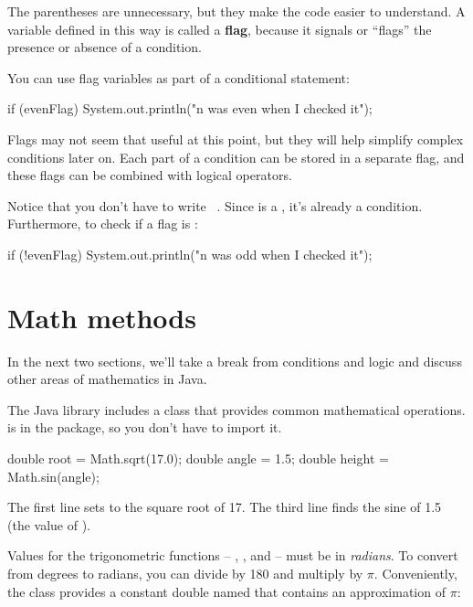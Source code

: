 The parentheses are unnecessary, but they make the code easier to understand.
A variable defined in this way is called a {\bf flag}, because it signals or ``flags'' the presence or absence of a condition.

You can use flag variables as part of a conditional statement:

\begin{code}
if (evenFlag) {
    System.out.println("n was even when I checked it");
}
\end{code}

Flags may not seem that useful at this point, but they will help simplify complex conditions later on.
Each part of a condition can be stored in a separate flag, and these flags can be combined with logical operators.

Notice that you don't have to write ~.
Since  is a , it's already a condition.
Furthermore, to check if a flag is :

\begin{code}
if (!evenFlag) {
    System.out.println("n was odd when I checked it");
}
\end{code}


\section{Math methods}

In the next two sections, we'll take a break from conditions and logic and discuss other areas of mathematics in Java.


The Java library includes a  class that provides common mathematical operations.
 is in the  package, so you don't have to import it.

\begin{code}
double root = Math.sqrt(17.0);
double angle = 1.5;
double height = Math.sin(angle);
\end{code}

The first line sets  to the square root of 17.
The third line finds the sine of 1.5 (the value of ).


Values for the trigonometric functions -- , , and  -- must be in {\em radians}.
To convert from degrees to radians, you can divide by 180 and multiply by $\pi$.
Conveniently, the  class provides a constant double named  that contains an approximation of $\pi$:

